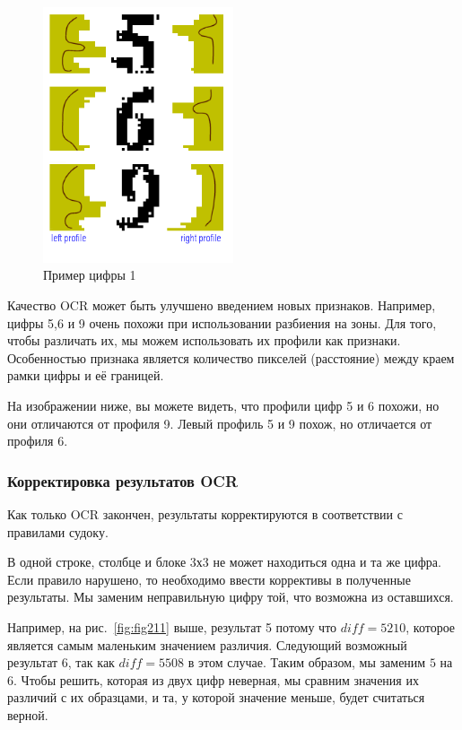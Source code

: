 \begin{figure}[ht!]
  \centering
  \includegraphics[width=0.5\textwidth]{inc/raster/design2-13.png}
  \caption{Пример цифры 1}
  \label{fig:fig212}
\end{figure}
Качество OCR может быть улучшено введением новых признаков. Например, цифры 5,6 и 9 очень похожи при использовании разбиения на зоны. Для того, чтобы различать их, мы можем использовать их профили как признаки. Особенностью признака является количество пикселей (расстояние) между краем рамки цифры и её границей.

На изображении ниже, вы можете видеть, что профили цифр 5 и 6 похожи, но они отличаются от профиля 9. Левый профиль 5 и 9 похож, но отличается от профиля 6.

\subsubsection{Корректировка результатов OCR}

Как только OCR закончен, результаты корректируются в соответствии с правилами судоку. 

В одной строке, столбце и блоке 3х3 не может находиться одна и та же цифра. Если правило нарушено, то необходимо ввести коррективы в полученные результаты. Мы заменим неправильную цифру той, что возможна из оставшихся. 

Например, на рис.~\ref{fig:fig211} выше, результат 5 потому что $diff = 5210$, которое является самым маленьким значением различия. Следующий возможный результат $6$, так как $diff = 5508$ в этом случае. Таким образом, мы заменим $5$ на $6$. Чтобы решить, которая из двух цифр неверная, мы сравним значения их различий с их образцами, и та, у которой значение меньше, будет считаться верной. 

